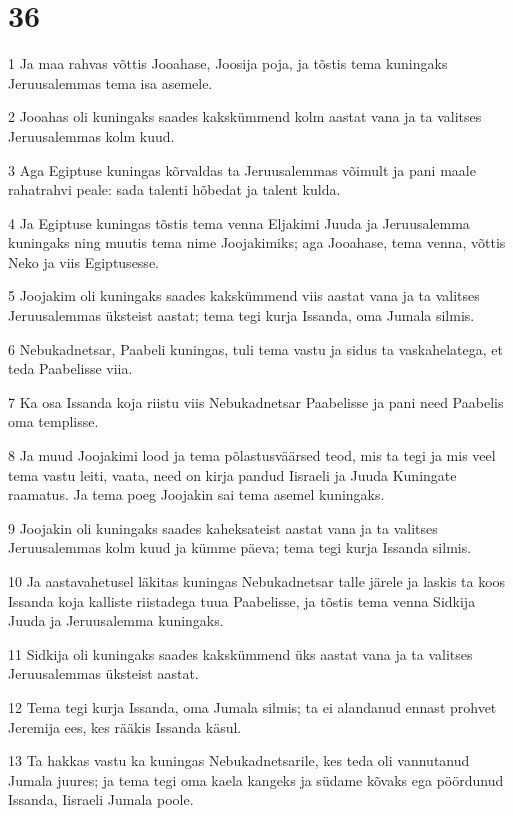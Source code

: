 \chapter{36}

\par 1 Ja maa rahvas võttis Jooahase, Joosija poja, ja tõstis tema kuningaks Jeruusalemmas tema isa asemele.
\par 2 Jooahas oli kuningaks saades kakskümmend kolm aastat vana ja ta valitses Jeruusalemmas kolm kuud.
\par 3 Aga Egiptuse kuningas kõrvaldas ta Jeruusalemmas võimult ja pani maale rahatrahvi peale: sada talenti hõbedat ja talent kulda.
\par 4 Ja Egiptuse kuningas tõstis tema venna Eljakimi Juuda ja Jeruusalemma kuningaks ning muutis tema nime Joojakimiks; aga Jooahase, tema venna, võttis Neko ja viis Egiptusesse.
\par 5 Joojakim oli kuningaks saades kakskümmend viis aastat vana ja ta valitses Jeruusalemmas üksteist aastat; tema tegi kurja Issanda, oma Jumala silmis.
\par 6 Nebukadnetsar, Paabeli kuningas, tuli tema vastu ja sidus ta vaskahelatega, et teda Paabelisse viia.
\par 7 Ka osa Issanda koja riistu viis Nebukadnetsar Paabelisse ja pani need Paabelis oma templisse.
\par 8 Ja muud Joojakimi lood ja tema põlastusväärsed teod, mis ta tegi ja mis veel tema vastu leiti, vaata, need on kirja pandud Iisraeli ja Juuda Kuningate raamatus. Ja tema poeg Joojakin sai tema asemel kuningaks.
\par 9 Joojakin oli kuningaks saades kaheksateist aastat vana ja ta valitses Jeruusalemmas kolm kuud ja kümme päeva; tema tegi kurja Issanda silmis.
\par 10 Ja aastavahetusel läkitas kuningas Nebukadnetsar talle järele ja laskis ta koos Issanda koja kalliste riistadega tuua Paabelisse, ja tõstis tema venna Sidkija Juuda ja Jeruusalemma kuningaks.
\par 11 Sidkija oli kuningaks saades kakskümmend üks aastat vana ja ta valitses Jeruusalemmas üksteist aastat.
\par 12 Tema tegi kurja Issanda, oma Jumala silmis; ta ei alandanud ennast prohvet Jeremija ees, kes rääkis Issanda käsul.
\par 13 Ta hakkas vastu ka kuningas Nebukadnetsarile, kes teda oli vannutanud Jumala juures; ja tema tegi oma kaela kangeks ja südame kõvaks ega pöördunud Issanda, Iisraeli Jumala poole.
